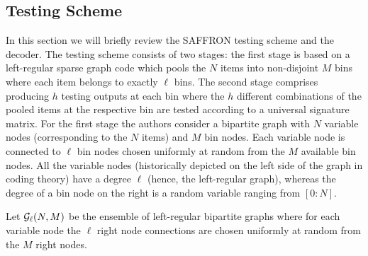 \documentclass[conference,twocolumn]{IEEEtran}
\begin{document}
%
\subsection*{Testing Scheme}
In this section we will briefly review the SAFFRON testing scheme \cite{lee2015saffron} and the decoder. The testing scheme consists of two stages: the first stage is based on a left-regular sparse graph code which pools the $N$ items into non-disjoint $M$ bins where each item belongs to exactly $\ell$ bins. The second stage comprises producing $h$ testing outputs at each bin where the $h$ different combinations of the pooled items at the respective bin are tested according to a universal signature matrix. For the first stage the authors consider a bipartite graph with $N$ variable nodes (corresponding to the $N$ items) and $M$ bin nodes. Each variable node is connected to $\ell$ bin nodes chosen uniformly at random from the $M$ available bin nodes. All the variable nodes (historically depicted on the left side of the graph in coding theory) have a degree $\ell$ (hence, the left-regular graph), whereas the degree of a bin node on the right is a random variable ranging from $[0:N]$.

\begin{definition}
Let $\mathcal{G}_{\ell}(N,M)$ be the ensemble of left-regular bipartite graphs where for each variable node the $\ell$ right node connections are chosen uniformly at random from the $M$ right nodes.
\end{definition}
\end{document}
